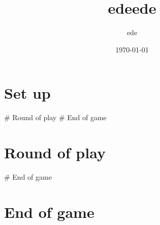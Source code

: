 \documentclass{article}%
\title{edeede}%
\author{ede}%
\date{\today}%
\begin{document}
%
\pagestyle{empty}%
\normalsize%
\maketitle%
\section{ Set up
}%
\label{sec:Setup}%
\# Round of play
%
\# End of game

%
\section{ Round of play
}%
\label{sec:Roundofplay}%
\# End of game

%
\section{ End of game}%
\label{sec:Endofgame}%

%
\end{document}

